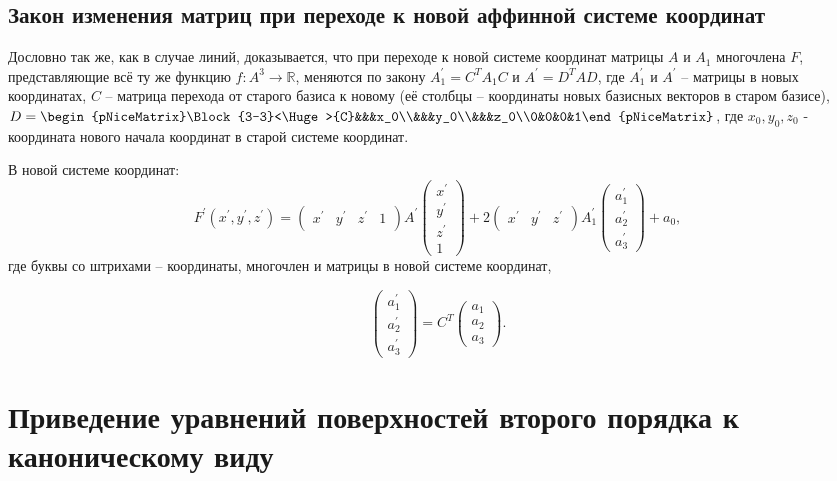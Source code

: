 \documentclass[a4paper, 12pt]{article}
\theoremstyle{definition}
\begin{document}
\subsection{Закон изменения матриц при переходе к новой аффинной системе координат}
Дословно так же, как в случае линий, доказывается, что при переходе к новой системе координат матрицы $A$ и $A_1$ многочлена $F$, представляющие всё ту же функцию $f: A^3 \to \mathbb{R}$, меняются по закону $A_1^{'} = C^T A_1 C$ и $A^{'} = D^T A D$, где $A_1^{'}$ и $A^{'}$ – матрицы в новых координатах, $C$ – матрица перехода от старого базиса к новому (её столбцы – координаты новых базисных векторов в старом базисе),
$D = \begin{pNiceMatrix}\Block{3-3}<\Huge>{C}&&&x_0\\&&&y_0\\&&&z_0\\0&0&0&1\end{pNiceMatrix}$, где
$x_0, y_0, z_0$ - координата нового начала координат в старой системе координат.

В новой системе координат:
\[ F^{'}(x^{'},y^{'},z^{'}) = \begin{pmatrix}
    x^{'} & y^{'} & z^{'} & 1
\end{pmatrix}
A^{'}
\begin{pmatrix}
    x^{'} \\ y^{'} \\ z^{'} \\ 1
\end{pmatrix}
+ 2 \begin{pmatrix}
    x^{'} & y^{'} & z^{'}
\end{pmatrix}
A_1^{'}
\begin{pmatrix}
    a_1^{'} \\ a_2^{'} \\ a_3^{'}
\end{pmatrix} 
+ a_0,
\]
где буквы со штрихами – координаты, многочлен и матрицы в новой системе координат,

\[
\begin{pmatrix}
    a_1^{'} \\ a_2^{'} \\ a_3^{'}
\end{pmatrix} = C^T 
\begin{pmatrix}
    a_1 \\ a_2 \\ a_3
\end{pmatrix}.
\]


\section{Приведение уравнений поверхностей второго порядка к каноническому виду}
\end{document}
